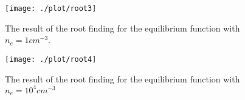 \begin{figure}[!h]
    \centering
    \texttt{[image: ./plot/root3]}
    \caption{The result of the root finding for the equilibrium function with $n_e = 1 cm^{-3}$.}
    \label{fig:root3}
\end{figure}

\begin{figure}[!h]
    \centering
    \texttt{[image: ./plot/root4]}
    \caption{The result of the root finding for the equilibrium function with $n_e = 10^4 cm^{-3}$}
    \label{fig:root4}
\end{figure}